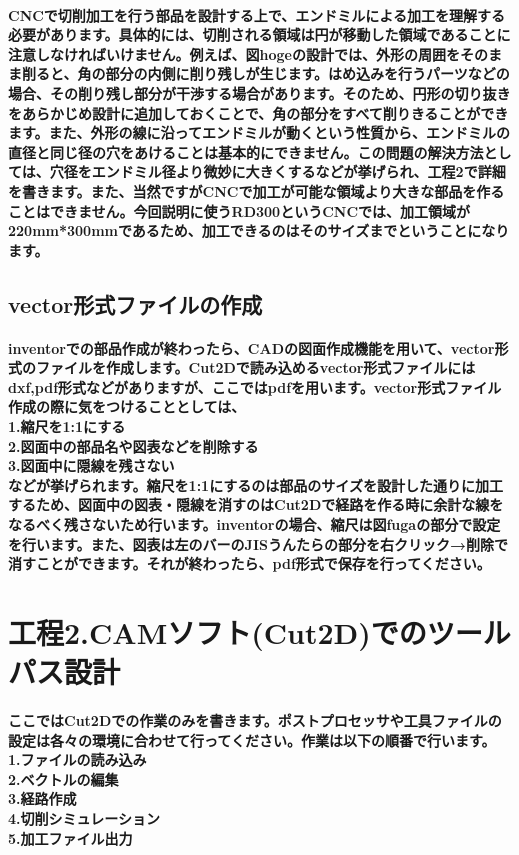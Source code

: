 \documentclass[b5paper, 9pt, twocolumn, titlepage,openany]{jsbook}%
\begin{document}
\paragraph{CNCで切削加工を行う部品を設計する上で、エンドミルによる加工を理解する必要があります。具体的には、切削される領域は円が移動した領域であることに注意しなければいけません。例えば、図hogeの設計では、外形の周囲をそのまま削ると、角の部分の内側に削り残しが生じます。はめ込みを行うパーツなどの場合、その削り残し部分が干渉する場合があります。そのため、円形の切り抜きをあらかじめ設計に追加しておくことで、角の部分をすべて削りきることができます。また、外形の線に沿ってエンドミルが動くという性質から、エンドミルの直径と同じ径の穴をあけることは基本的にできません。この問題の解決方法としては、穴径をエンドミル径より微妙に大きくするなどが挙げられ、工程2で詳細を書きます。また、当然ですがCNCで加工が可能な領域より大きな部品を作ることはできません。今回説明に使うRD300というCNCでは、加工領域が220mm*300mmであるため、加工できるのはそのサイズまでということになります。}

\subsection{vector形式ファイルの作成}
\paragraph{inventorでの部品作成が終わったら、CADの図面作成機能を用いて、vector形式のファイルを作成します。Cut2Dで読み込めるvector形式ファイルにはdxf,pdf形式などがありますが、ここではpdfを用います。vector形式ファイル作成の際に気をつけることとしては、\\
1.縮尺を1:1にする\\
2.図面中の部品名や図表などを削除する\\
3.図面中に隠線を残さない\\
などが挙げられます。縮尺を1:1にするのは部品のサイズを設計した通りに加工するため、図面中の図表・隠線を消すのはCut2Dで経路を作る時に余計な線をなるべく残さないため行います。inventorの場合、縮尺は図fugaの部分で設定を行います。また、図表は左のバーのJISうんたらの部分を右クリック→削除で消すことができます。それが終わったら、pdf形式で保存を行ってください。}

\section{工程2.CAMソフト(Cut2D)でのツールパス設計}
\paragraph{ここではCut2Dでの作業のみを書きます。ポストプロセッサや工具ファイルの設定は各々の環境に合わせて行ってください。作業は以下の順番で行います。
1.ファイルの読み込み\\
2.ベクトルの編集\\
3.経路作成\\
4.切削シミュレーション\\
5.加工ファイル出力}
\end{document}
